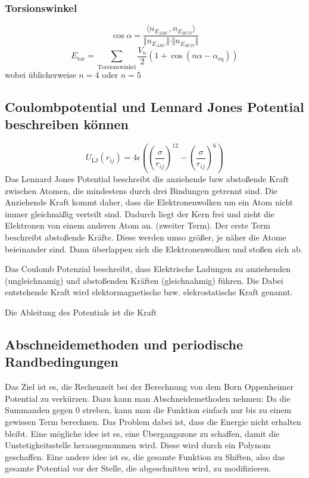 \documentclass[]{article}
\begin{document}
\subsubsection*{Torsionswinkel}
\[ \cos \alpha = \frac{\langle n_{E_{ABC}}, n_{E_{BCD}}\rangle}{\Vert n_{E_{ABC}} \Vert \cdot \Vert n_{E_{BCD}} \Vert} \]
\begin{equation*}
E_{\text{tor}} = \sum_{\text{Torsionswinkel}} \frac{V_n}{2} \left( 1+ \cos(n \alpha - \alpha_{\text{eq}}) \right)
\end{equation*}
wobei üblicherweise $n=4$ oder $n=5$

\subsection*{Coulombpotential und Lennard Jones Potential beschreiben können}
\begin{equation*}
U_{\text{LJ}} (r_{ij}) = 4 \epsilon  \left( \left( \frac{\sigma}{r_{ij}} \right)^{12} - \left( \frac{\sigma}{r_{ij}} \right)^6 \right)
\end{equation*}
Das Lennard Jones Potential beschreibt die anziehende bzw abstoßende Kraft zwischen Atomen, die mindestens durch drei Bindungen getrennt sind. Die Anziehende Kraft kommt daher, dass die Elektronenwolken um ein Atom nicht immer gleichmäßig verteilt sind. Dadurch liegt der Kern frei und zieht die Elektronen von einem anderen Atom an. (zweiter Term). Der erste Term beschreibt abstoßende Kräfte. Diese werden umso größer, je näher die Atome beieinander sind. Dann überlappen sich die Elektronenwolken und stoßen sich ab. 

Das Coulomb Potenzial beschreibt, dass Elektrische Ladungen zu anziehenden (ungleichnamig) und abstoßenden Kräften (gleichnahmig) führen. Die Dabei entstehende Kraft wird elektormagnetische bzw. elekrostatische Kraft genannt.

 
Die Ableitung des Potentials ist die Kraft

\subsection*{Abschneidemethoden und periodische Randbedingungen}
Das Ziel ist es, die Rechenzeit bei der Berechnung von dem Born Oppenheimer Potential zu verkürzen. Dazu kann man Abschneidemethoden nehmen: Da die Summanden gegen 0 streben, kann man die Funktion einfach nur bis zu einem gewissen Term berechnen. Das Problem dabei ist, dass die Energie nicht erhalten bleibt. Eine mögliche idee ist es, eine Übergangszone zu schaffen, damit die Unstetigkeitsstelle herausgenommen wird. Diese wird durch ein Polynom geschaffen. Eine andere idee ist es, die gesamte Funktion zu Shiften, also das gesamte Potential vor der Stelle, die abgeschnitten wird, zu modifizieren. 
\end{document}
